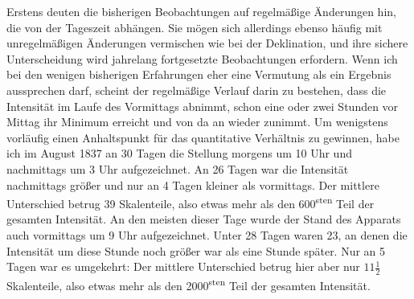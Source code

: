 Erstens deuten die bisherigen Beobachtungen auf regelmäßige Änderungen hin, die von der Tageszeit abhängen. Sie mögen sich allerdings ebenso häufig mit unregelmäßigen Änderungen vermischen wie bei der Deklination, und ihre sichere Unterscheidung wird jahrelang fortgesetzte Beobachtungen erfordern. Wenn ich bei den wenigen bisherigen Erfahrungen eher eine Vermutung als ein Ergebnis aussprechen darf, scheint der regelmäßige Verlauf darin zu bestehen, dass die Intensität im Laufe des Vormittags abnimmt, schon eine oder zwei Stunden vor Mittag ihr Minimum erreicht und von da an wieder zunimmt. Um wenigstens vorläufig einen Anhaltspunkt für das quantitative Verhältnis zu gewinnen, habe ich im August 1837 an 30 Tagen die Stellung morgens um 10 Uhr und nachmittags um 3 Uhr aufgezeichnet. An 26 Tagen war die Intensität nachmittags größer und nur an 4 Tagen kleiner als vormittags. Der mittlere Unterschied betrug 39 Skalenteile, also etwas mehr als den 600\textsuperscript{sten} Teil der gesamten Intensität. An den meisten dieser Tage wurde der Stand des Apparats auch vormittags um 9 Uhr aufgezeichnet. Unter 28 Tagen waren 23, an denen die Intensität um diese Stunde noch größer war als eine Stunde später. Nur an 5 Tagen war es umgekehrt: Der mittlere Unterschied betrug hier aber nur $11\frac{1}{2}$ Skalenteile, also etwas mehr als den 2000\textsuperscript{sten} Teil der gesamten Intensität.

